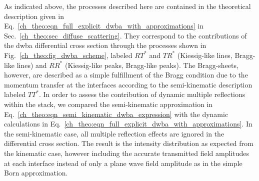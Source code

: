 As indicated above, the processes described here are contained in the theoretical description given in Eq.~\eqref{ch_theo:eqn_full_explicit_dwba_with_approximations} in Sec.~\ref{ch_theo:sec_diffuse_scattering}. They correspond to the contributions of the \gls{dwba} differential cross section through the processes shown in Fig.~\ref{ch_theo:fig_dwba_scheme}, labeled $R T^*$ and $T R^*$ (Kiessig-like lines, Bragg-like lines) and $R R^*$ (Kiessig-like peaks, Bragg-like peaks). The Bragg-sheets, however, are described as a simple fulfillment of the Bragg condition due to the momentum transfer at the interfaces according to the semi-kinematic description labeled $T T^*$. In order to assess the contribution of dynamic multiple reflections within the stack, we compared the semi-kinematic approximation in Eq.~\eqref{ch_theo:eqn_semi_kinematic_dwba_expression} with the dynamic calculations in Eq.~\eqref{ch_theo:eqn_full_explicit_dwba_with_approximations}. In the semi-kinematic case, all multiple reflection effects are ignored in the differential cross section. The result is the intensity distribution as expected from the kinematic case, however including the accurate transmitted field amplitudes at each interface instead of only a plane wave field amplitude as in the simple Born approximation. 

